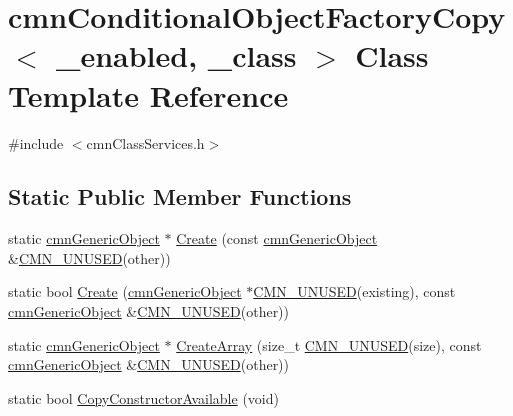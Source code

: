 \hypertarget{classcmn_conditional_object_factory_copy}{\section{cmn\-Conditional\-Object\-Factory\-Copy$<$ \-\_\-enabled, \-\_\-class $>$ Class Template Reference}
\label{classcmn_conditional_object_factory_copy}
}


{\ttfamily \#include $<$cmn\-Class\-Services.\-h$>$}

\subsection*{Static Public Member Functions}
\begin{DoxyCompactItemize}
\item 
static \hyperlink{classcmn_generic_object}{cmn\-Generic\-Object} $\ast$ \hyperlink{classcmn_conditional_object_factory_copy_af550d5e1d54b9d1ba41453f21b919714}{Create} (const \hyperlink{classcmn_generic_object}{cmn\-Generic\-Object} \&\hyperlink{cmn_portability_8h_a021894e2626935fa2305434b1e893ff6}{C\-M\-N\-\_\-\-U\-N\-U\-S\-E\-D}(other))
\item 
static bool \hyperlink{classcmn_conditional_object_factory_copy_a5a64f02f150726ba877f6c439b77c600}{Create} (\hyperlink{classcmn_generic_object}{cmn\-Generic\-Object} $\ast$\hyperlink{cmn_portability_8h_a021894e2626935fa2305434b1e893ff6}{C\-M\-N\-\_\-\-U\-N\-U\-S\-E\-D}(existing), const \hyperlink{classcmn_generic_object}{cmn\-Generic\-Object} \&\hyperlink{cmn_portability_8h_a021894e2626935fa2305434b1e893ff6}{C\-M\-N\-\_\-\-U\-N\-U\-S\-E\-D}(other))
\item 
static \hyperlink{classcmn_generic_object}{cmn\-Generic\-Object} $\ast$ \hyperlink{classcmn_conditional_object_factory_copy_a9660cf5631b998882a36160c255f4218}{Create\-Array} (size\-\_\-t \hyperlink{cmn_portability_8h_a021894e2626935fa2305434b1e893ff6}{C\-M\-N\-\_\-\-U\-N\-U\-S\-E\-D}(size), const \hyperlink{classcmn_generic_object}{cmn\-Generic\-Object} \&\hyperlink{cmn_portability_8h_a021894e2626935fa2305434b1e893ff6}{C\-M\-N\-\_\-\-U\-N\-U\-S\-E\-D}(other))
\item 
static bool \hyperlink{classcmn_conditional_object_factory_copy_a93338467fa8ae3e034b0fe0fe4c38c5e}{Copy\-Constructor\-Available} (void)
\end{DoxyCompactItemize}


